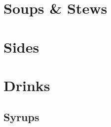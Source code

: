 \documentclass{family_cookbook}
\begin{document}
\chapter{Soups \& Stews}
\minitoc%
\clearpage








\chapter{Sides}
\minitoc%
\clearpage





\chapter{Drinks}
\minitoc%
\clearpage
\section{Syrups}
{%
	\let\section\subsection%
	\let\subsection\subsubsection%
	
	
	
	
	
	
	
	
}


\end{document}
